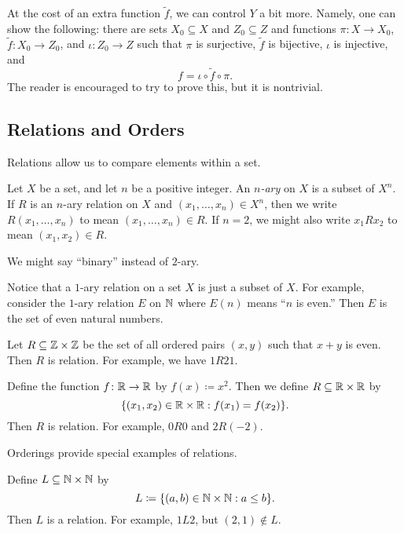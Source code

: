 \documentclass[../main.tex]{subfiles}
\begin{document}
\begin{remark}
    At the cost of an extra function $\widetilde f$, we can control $Y$ a bit more. Namely, one can show the following: there are sets $X_0\subseteq X$ and $Z_0\subseteq Z$ and functions $\pi\colon X \to X_0$, $\widetilde f\colon X_0 \to Z_0$, and $\iota\colon Z_0 \to Z$ such that $\pi$ is surjective, $\widetilde f$ is bijective, $\iota$ is injective, and
    \[f = \iota \circ \widetilde f \circ \pi.\]
    The reader is encouraged to try to prove this, but it is nontrivial.
\end{remark}

\subsection{Relations and Orders}
Relations allow us to compare elements within a set.
\begin{definition}[relation]
    Let $X$ be a set, and let $n$ be a positive integer. An \emph{$n$-ary } on $X$ is a subset of $X^n$. If $R$ is an $n$-ary relation on $X$ and $(x_1, \ldots, x_n) \in X^n$, then we write $R(x_1, \ldots, x_n)$ to mean $(x_1,\ldots,x_n)\in R$. If $n=2$, we might also write $x_1Rx_2$ to mean $(x_1,x_2)\in R$.
\end{definition}
We might say ``binary'' instead of $2$-ary.
\begin{example}
    Notice that a $1$-ary relation on a set $X$ is just a subset of $X$. For example, consider the $1$-ary relation $E$ on $\mathbb N$ where $E(n)$ means ``$n$ is even.'' Then $E$ is the set of even natural numbers. 
\end{example}
\begin{example}
    Let $R\subseteq\mathbb Z\times\mathbb Z$ be the set of all ordered pairs $(x,y)$ such that $x+y$ is even. Then $R$ is relation. For example, we have $1R21$.
\end{example}
\begin{example} \label{ex:f-gives-equiv-relation}
    Define the function $f\colon\mathbb R\to\mathbb R$ by $f(x)\coloneqq x^2$. Then we define $R\subseteq\mathbb R\times\mathbb R$ by
    \[\{(x_1,x_2)\in\mathbb R\times\mathbb R:f(x_1)=f(x_2)\}.\]
    Then $R$ is relation. For example, $0R0$ and $2R(-2)$.
\end{example}
Orderings provide special examples of relations.
\begin{example} \label{ex:le-on-n}
    Define $L\subseteq\mathbb N\times\mathbb N$ by
    \[L\coloneqq\{(a,b)\in\mathbb N\times\mathbb N:a\le b\}.\]
    Then $L$ is a relation. For example, $1L2$, but $(2,1)\notin L$.
\end{example}
\end{document}
